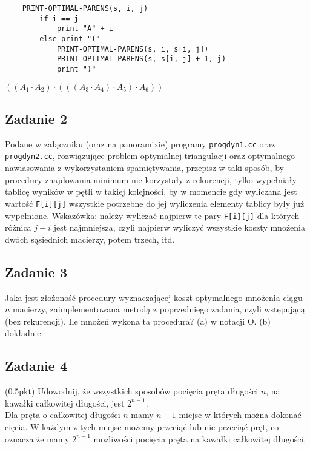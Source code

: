 \documentclass{article}
\begin{document}
\begin{center}
    \begin{lstlisting}
    PRINT-OPTIMAL-PARENS(s, i, j)
        if i == j
            print "A" + i
        else print "("
            PRINT-OPTIMAL-PARENS(s, i, s[i, j])
            PRINT-OPTIMAL-PARENS(s, s[i, j] + 1, j)
            print ")"
    \end{lstlisting}
    $((A_1 \cdot A_2) \cdot (((A_3 \cdot A_4) \cdot A_5) \cdot A_6))$
\end{center}

\subsection*{Zadanie 2}
Podane w załączniku (oraz na panoramixie) programy \verb|progdyn1.cc| oraz \verb|progdyn2.cc|,
rozwiązujące problem optymalnej triangulacji oraz optymalnego nawiasowania z wykorzystaniem
spamiętywania, przepisz w taki sposób, by procedury znajdowania minimum
nie korzystały z rekurencji, tylko wypełniały tablicę wyników w pętli w takiej kolejności,
by w momencie gdy wyliczana jest wartość \verb|F[i][j]| wszystkie potrzebne do jej wyliczenia
elementy tablicy były już wypełnione. Wskazówka: należy wyliczać najpierw te pary
\verb|F[i][j]| dla których różnica $j-i$ jest najmniejsza, czyli najpierw wyliczyć wszystkie
koszty mnożenia dwóch sąsiednich macierzy, potem trzech, itd.

\subsection*{Zadanie 3}
Jaka jest złożoność procedury wyznaczającej koszt optymalnego mnożenia ciągu
$n$ macierzy, zaimplementowana metodą z poprzedniego zadania, czyli wstępującą (bez rekurencji).
Ile mnożeń wykona ta procedura? (a) w notacji O. (b) dokładnie.

\subsection*{Zadanie 4}
(0.5pkt) Udowodnij, że wszystkich sposobów pocięcia pręta długości $n$, na kawałki całkowitej długości, jest $2^{n-1}$.
\noindent \\[1em]
Dla pręta o całkowitej długości $n$ mamy $n-1$ miejsc w których można dokonać cięcia. W każdym z tych miejsc możemy
przeciąć lub nie przeciąć pręt, co oznacza że mamy $2^{n-1}$ możliwości pocięcia pręta na kawałki całkowitej długości.
\end{document}
